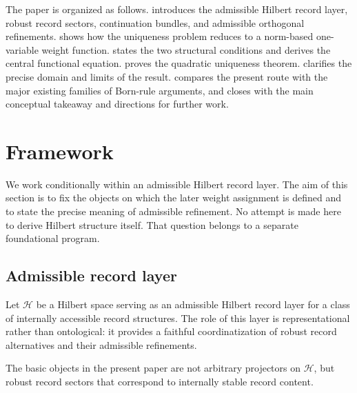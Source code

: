 \documentclass[11pt]{article}
\theoremstyle{remark}
\numberwithin{equation}{section}
\newcommand{\HH}{\mathcal{H}}
\begin{document}
The paper is organized as follows.  introduces the admissible Hilbert record layer, robust record sectors, continuation bundles, and admissible orthogonal refinements.  shows how the uniqueness problem reduces to a norm-based one-variable weight function.  states the two structural conditions and derives the central functional equation.  proves the quadratic uniqueness theorem.  clarifies the precise domain and limits of the result.  compares the present route with the major existing families of Born-rule arguments, and  closes with the main conceptual takeaway and directions for further work.


\section{Framework}
\label{sec:framework}

We work conditionally within an admissible Hilbert record layer. The aim of this section is to fix the objects on which the later weight assignment is defined and to state the precise meaning of admissible refinement. No attempt is made here to derive Hilbert structure itself. That question belongs to a separate foundational program.

\subsection{Admissible record layer}

Let $\HH$ be a Hilbert space serving as an admissible Hilbert record layer for a class of internally accessible record structures. The role of this layer is representational rather than ontological: it provides a faithful coordinatization of robust record alternatives and their admissible refinements.

The basic objects in the present paper are not arbitrary projectors on $\HH$, but robust record sectors that correspond to internally stable record content.
\end{document}
